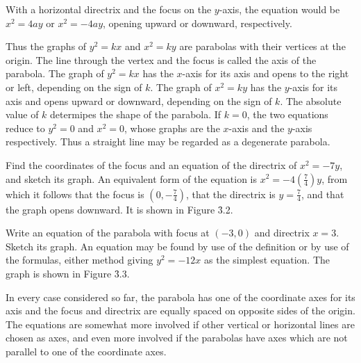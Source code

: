With a horizontal directrix and the focus on the $y$-axis, the equation would be $x^2= 4ay$ or $x^2= - 4ay$, opening upward or downward, respectively.

Thus the graphs of $y^2 = kx$ and $x^2 = ky$ are parabolas with their vertices at the origin. The line through the vertex and the focus is called the axis of the parabola. The graph of $y^2 = kx$ has the $x $-axis for its axis and opens to the right or left, depending on the sign of $k$. The graph of $x^2 = ky$ has the $y$-axis for its axis and opens upward or downward, depending on the sign of $k$. The absolute value of $k$ determipes the shape of the parabola. If $k = 0$, the two equations reduce to $y^2= 0$ and $x^2 = 0$, whose graphs are the $x$-axis and the $y$-axis respectively. Thus a straight line may be regarded as a degenerate parabola.
\medskip

\begin{example}
Find the coordinates of the focus and an equation of the directrix of $x^2 = - 7y$, and sketch its graph. An equivalent form of the equation is $x^2 = - 4(\frac{7}{4})y$, from which it follows that the focus is $(0, - \frac{7}{4})$, that the directrix is $y = \frac{7}{4}$, and that the graph opens downward. It is shown in Figure \f{3.2}.
\end{example}
\medskip
 

\begin{example}
Write an equation of the parabola with focus at $(-3, 0)$ and directrix $x = 3$. Sketch its graph. An equation may be found by use of the definition or by use of the formulas, either method giving $y^2 = -12x$ as the simplest equation. The graph is shown in Figure \f{3.3}.
\end{example}
\medskip

In every case considered so far, the parabola has one of the coordinate axes for its axis and the focus and directrix are equally spaced on opposite
sides of the origin. The equations are somewhat more involved if other vertical or horizontal lines are chosen as axes, and even more involved if the parabolas have axes which are not parallel to one of the coordinate axes.


